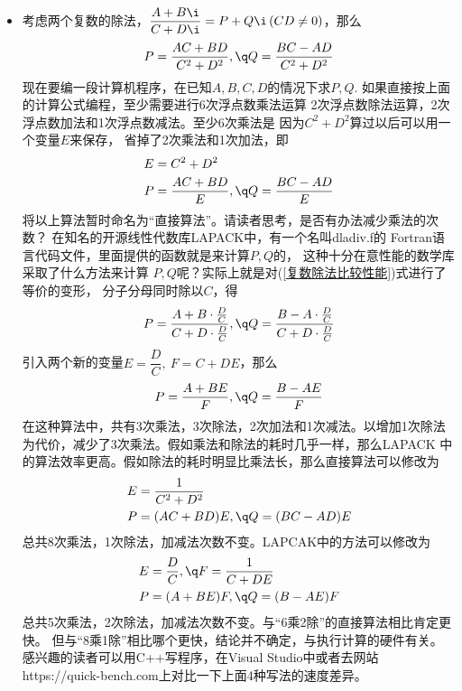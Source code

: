 \begin{itemize}[leftmargin=\inteval{\myitemleftmargin}pt,itemsep=
   \inteval{\myitemitempsep}pt,topsep=\inteval{\myitemtopsep}pt]
\item 考虑两个复数的除法，$ \dfrac{A+B\i}{C+D\i}=P+Q\i\, (CD\neq 0) $，那么
\begin{align}\label{复数除法比较性能}
    P=\dfrac{AC+BD}{C^2+D^2},\q Q=\dfrac{BC-AD}{C^2+D^2}  
\end{align}
现在要编一段计算机程序，在已知$ A, B, C, D $的情况下求$ P,Q $.
如果直接按上面的计算公式编程，至少需要进行6次浮点数乘法运算
2次浮点数除法运算，2次浮点数加法和1次浮点数减法。至少6次乘法是
因为$ C^2+D^2 $算过以后可以用一个变量$ E $来保存，
省掉了2次乘法和1次加法，即
\begin{align*}
    E &=C^2+D^2\\
    P &=\dfrac{AC+BD}{E},\q Q=\dfrac{BC-AD}{E}
\end{align*}
将以上算法暂时命名为“直接算法”。请读者思考，是否有办法减少乘法的次数？
在知名的开源线性代数库LAPACK中，有一个名叫dladiv.f的
Fortran语言代码文件，里面提供的函数就是来计算$ P,Q $的，
这种十分在意性能的数学库采取了什么方法来计算
$ P,Q $呢？实际上就是对(\ref{复数除法比较性能})式进行了等价的变形，
分子分母同时除以$ C $，得
\begin{align*}
    P=\frac{A+B\cdot\frac{D}{C}}{C+D\cdot\frac{D}{C}},\q
    Q=\frac{B-A\cdot\frac{D}{C}}{C+D\cdot\frac{D}{C}}
\end{align*}
引入两个新的变量$ E=\dfrac{D}{C},\ F=C+DE $，那么
\begin{gather*}
    P=\dfrac{A+BE}{F},\q Q=\dfrac{B-AE}{F}
\end{gather*}
在这种算法中，共有3次乘法，3次除法，2次加法和1次减法。以增加1次除法
为代价，减少了3次乘法。假如乘法和除法的耗时几乎一样，那么LAPACK
中的算法效率更高。假如除法的耗时明显比乘法长，那么直接算法可以修改为
\begin{align*}
    E &=\dfrac{1}{C^2+D^2} \\
    P &=(AC+BD)E,\q Q=(BC-AD)E
\end{align*}
总共8次乘法，1次除法，加减法次数不变。LAPCAK中的方法可以修改为
\begin{align*}
    E &=\dfrac{D}{C},\q F=\dfrac{1}{C+DE} \\
    P &=(A+BE)F,\q Q=(B-AE)F
\end{align*}
总共5次乘法，2次除法，加减法次数不变。与“6乘2除”的直接算法相比肯定更快。
但与“8乘1除”相比哪个更快，结论并不确定，与执行计算的硬件有关。
感兴趣的读者可以用C++写程序，在Visual Studio中或者去网站
https://quick-bench.com上对比一下上面4种写法的速度差异。


\end{itemize}

